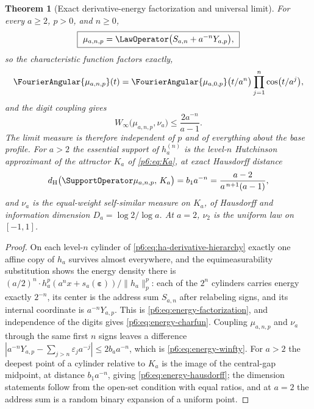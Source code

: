 \documentclass[11pt,oneside]{article}
\numberwithin{equation}{section}
\newtheorem{theorem}{Theorem}[section]
\theoremstyle{definition}
\theoremstyle{remark}
\begin{document}
\begin{theorem}[Exact derivative-energy factorization and universal limit]
\label{p6:thm:energy-factorization}
For every $a\ge2$, $p>0$, and $n\ge0$,
\begin{equation}\label{p6:eq:energy-factorization}
 \boxed{\ \mu_{a,n,p}=\LawOperator\bigl(S_{a,n}+a^{-n}Y_{a,p}\bigr),\ }
\end{equation}
so the characteristic function factors exactly,
\begin{equation}\label{p6:eq:energy-charfun}
 \FourierAngular{\mu_{a,n,p}}(t)
 =\FourierAngular{\mu_{a,0,p}}\bigl(t/a^{n}\bigr)
 \prod_{j=1}^{n}\cos\bigl(t/a^{j}\bigr),
\end{equation}
and the digit coupling gives
\begin{equation}\label{p6:eq:energy-winfty}
 W_\infty\bigl(\mu_{a,n,p},\nu_a\bigr)\le\frac{2a^{-n}}{a-1}.
\end{equation}
The limit measure is therefore independent of $p$ and of everything about
the base profile.  For $a>2$ the essential support of $h_a^{(n)}$ is the
level-$n$ Hutchinson approximant of the attractor $K_a$ of
\eqref{p6:eq:Ka}, at exact Hausdorff distance
\begin{equation}\label{p6:eq:energy-hausdorff}
 d_{\mathrm H}\bigl(\SupportOperator\mu_{a,n,p},\,K_a\bigr)
 =b_1a^{-n}
 =\frac{a-2}{a^{\,n+1}(a-1)},
\end{equation}
and $\nu_a$ is the equal-weight self-similar measure on $K_a$, of Hausdorff
and information dimension $D_a=\log2/\log a$.  At $a=2$, $\nu_2$ is the
uniform law on $[-1,1]$.
\end{theorem}

\begin{proof}
On each level-$n$ cylinder of \eqref{p6:eq:ha-derivative-hierarchy} exactly
one affine copy of $h_a$ survives almost everywhere, and the
equimeasurability substitution shows the energy density there is
$(a/2)^n\cdot h_a^p(a^nx+s_a(\boldsymbol\varepsilon))/\|h_a\|_p^p$: each of
the $2^n$ cylinders carries energy exactly $2^{-n}$, its center is the
address sum $S_{a,n}$ after relabeling signs, and its internal coordinate is
$a^{-n}Y_{a,p}$.  This is \eqref{p6:eq:energy-factorization}, and
independence of the digits gives \eqref{p6:eq:energy-charfun}.  Coupling
$\mu_{a,n,p}$ and $\nu_a$ through the same first $n$ signs leaves a
difference $|a^{-n}Y_{a,p}-\sum_{j>n}\varepsilon_ja^{-j}|\le2b_aa^{-n}$,
which is \eqref{p6:eq:energy-winfty}.  For $a>2$ the deepest point of a
cylinder relative to $K_a$ is the image of the central-gap midpoint, at
distance $b_1a^{-n}$, giving \eqref{p6:eq:energy-hausdorff}; the dimension
statements follow from the open-set condition with equal ratios, and at
$a=2$ the address sum is a random binary expansion of a uniform point.
\end{proof}
\end{document}
